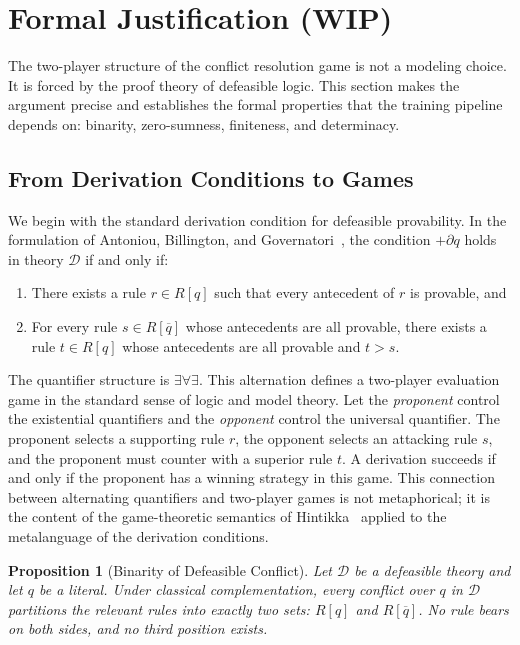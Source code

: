 \documentclass{article}
\newtheorem{proposition}{Proposition}
\newcommand{\D}{\mathcal{D}}
\newcommand{\comp}[1]{\overline{#1}}
\begin{document}
\section{Formal Justification (WIP)}
 
The two-player structure of the conflict resolution game is not a modeling choice. It is forced by the proof theory of defeasible logic. This section makes the argument precise and establishes the formal properties that the training pipeline depends on: binarity, zero-sumness, finiteness, and determinacy.
 
\subsection{From Derivation Conditions to Games}
 
We begin with the standard derivation condition for defeasible provability. In the formulation of Antoniou, Billington, and Governatori~\cite{antoniou2001representation}, the condition $+\partial q$ holds in theory $\D$ if and only if:
 
\begin{enumerate}[nosep]
    \item There exists a rule $r \in R[q]$ such that every antecedent of $r$ is provable, and
    \item For every rule $s \in R[\comp{q}]$ whose antecedents are all provable, there exists a rule $t \in R[q]$ whose antecedents are all provable and $t > s$.
\end{enumerate}
 
The quantifier structure is $\exists \forall \exists$. This alternation defines a two-player evaluation game in the standard sense of logic and model theory. Let the \emph{proponent} control the existential quantifiers and the \emph{opponent} control the universal quantifier. The proponent selects a supporting rule $r$, the opponent selects an attacking rule $s$, and the proponent must counter with a superior rule $t$. A derivation succeeds if and only if the proponent has a winning strategy in this game. This connection between alternating quantifiers and two-player games is not metaphorical; it is the content of the game-theoretic semantics of Hintikka~\cite{hintikka1996principles} applied to the metalanguage of the derivation conditions.
 
\begin{proposition}[Binarity of Defeasible Conflict]\label{prop:binarity}
Let $\D$ be a defeasible theory and let $q$ be a literal. Under classical complementation, every conflict over $q$ in $\D$ partitions the relevant rules into exactly two sets: $R[q]$ and $R[\comp{q}]$. No rule bears on both sides, and no third position exists.
\end{proposition}
 
\end{document}
